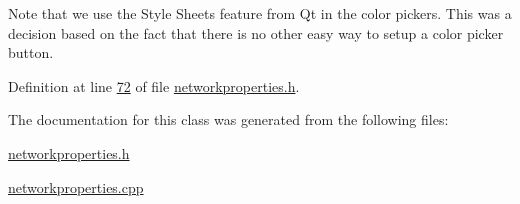 Note that we use the Style Sheets feature from Qt in the color pickers. This was a decision based on the fact that there is no other easy way to setup a color picker button. 

Definition at line \hyperlink{networkproperties_8h_source_l00072}{72} of file \hyperlink{networkproperties_8h_source}{networkproperties.\+h}.



The documentation for this class was generated from the following files\+:\begin{DoxyCompactItemize}
\item 
\hyperlink{networkproperties_8h}{networkproperties.\+h}\item 
\hyperlink{networkproperties_8cpp}{networkproperties.\+cpp}\end{DoxyCompactItemize}
